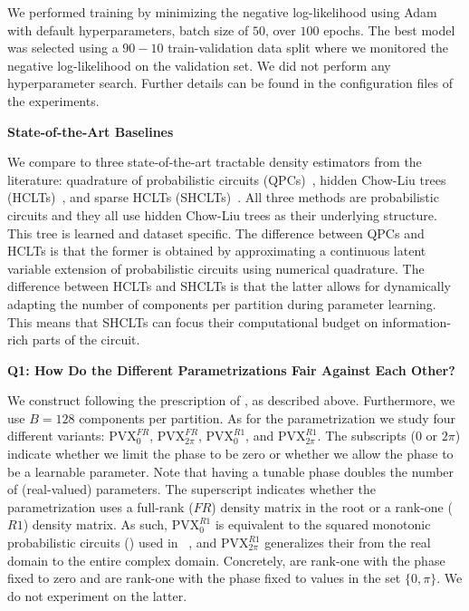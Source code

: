 We performed training by minimizing the negative log-likelihood using Adam~\citep{kingma2014adam} with default hyperparameters, batch size of $50$, over $100$ epochs.
The best model was selected using a $90-10$ train-validation data split where we monitored the negative log-likelihood on the validation set.
We did not perform any hyperparameter search.
Further details can be found in the configuration files of the experiments.



\textbf{State-of-the-Art Baselines}

We compare \pvcs to three state-of-the-art tractable density estimators from the literature: quadrature of probabilistic circuits (QPCs)~\citep{gala2024probabilistic}, hidden Chow-Liu trees (HCLTs)~\citep{liu2021tractable}, and sparse HCLTs (SHCLTs)~\citep{dang2022sparse}.
All three methods are probabilistic circuits and they all use hidden Chow-Liu trees as their underlying structure. This tree is learned and dataset specific. The difference between QPCs and HCLTs is that the former is obtained by approximating a continuous latent variable extension of probabilistic circuits using numerical quadrature. The difference between HCLTs and SHCLTs is that the latter allows for dynamically adapting the number of components per partition during parameter learning. This means that SHCLTs can focus their computational budget on information-rich parts of the circuit.



\textbf{Q1: How Do the Different \pvc Parametrizations Fair Against Each Other?}

We construct \pvcs following the prescription of \cite{zuidberg2024probabilistic}, as described above. Furthermore, we use $B=128$ components per partition.
As for the parametrization we study four different variants:
$\mathrm{PVX}_{0}^{FR}$,
$\mathrm{PVX}_{2\pi}^{FR}$,
$\mathrm{PVX}_{0}^{R1}$, and
$\mathrm{PVX}_{2\pi}^{R1}$.
The subscripts ($0$ or $2\pi$) indicate whether we limit the phase to be zero or whether we allow the phase to be a learnable parameter. Note that having a tunable phase doubles the number of (real-valued) parameters. The superscript indicates whether the parametrization uses a full-rank ($FR$) density matrix in the root or a rank-one ($R1$) density matrix.
As such, $\mathrm{PVX}_{0}^{R1}$ is equivalent to the  squared monotonic probabilistic circuits (\smpcs) used in ~\cite{loconte2024subtractive}, and $\mathrm{PVX}_{2\pi}^{R1}$ generalizes their \snpcs from the real domain to the entire complex domain. Concretely, \smpcs are rank-one \pvcs with the phase fixed to zero and \snpcs are rank-one \pvcs with the phase fixed to values in the set $\{0, \pi \}$. We do not experiment on the latter.

